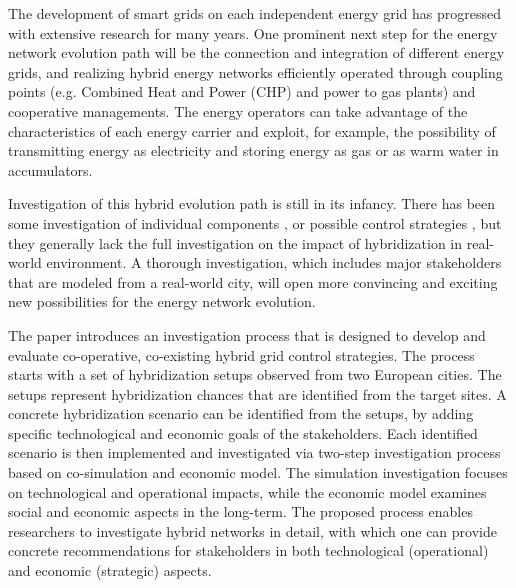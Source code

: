 \documentclass[a4paper,twoside]{article}
\begin{document}
The development of smart grids on each independent energy grid has
progressed with extensive research for many years. One prominent next
step for the energy network evolution path will be the connection and
integration of different energy grids, and realizing hybrid energy
networks efficiently operated through coupling points (e.g. Combined
Heat and Power (CHP) and power to gas plants) and cooperative
managements. 
The energy operators can take advantage of the characteristics of each  
energy carrier and exploit, for example, the possibility of
transmitting energy as electricity and storing energy as gas or as 
warm water in accumulators.  

Investigation of this hybrid evolution path is still in its
infancy. There has been some investigation of individual components
\cite{keirstead_2012} \cite{Derksen_2012}, or possible control
strategies \cite{arnold_2009}, but they generally lack the full
investigation on the impact of hybridization in real-world
environment. A thorough investigation, which includes major
stakeholders that are modeled from a real-world city, will open more
convincing and exciting new possibilities for the energy network
evolution.

The paper introduces an investigation process that is designed   
to develop and evaluate co-operative, co-existing hybrid grid control 
strategies. The process starts with a set of hybridization 
setups observed from two European cities. The setups represent
hybridization chances that are identified from the target sites. 
A concrete hybridization scenario can be identified from the setups,
by adding specific technological and economic goals of the
stakeholders. Each identified scenario is then implemented and
investigated via two-step investigation process based on
co-simulation and economic model. The simulation investigation 
focuses on technological and operational impacts, while the
economic model examines social and economic aspects in the
long-term. 
The proposed process enables researchers to investigate hybrid
networks in detail, with which one can provide concrete
recommendations for stakeholders in both technological (operational)
and economic (strategic) aspects.  
\end{document}
